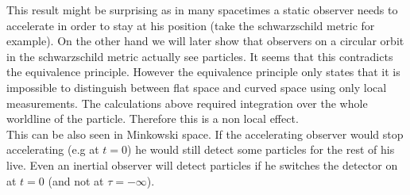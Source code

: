 This result might be surprising as in many spacetimes a static observer needs to accelerate in order to stay at his position (take the schwarzschild metric for example). On the other hand we will later show that observers on a circular orbit in the schwarzschild metric actually see particles. It seems that this contradicts the equivalence principle. However the equivalence principle only states that it is impossible to distinguish between flat space and curved space using only local measurements. The calculations above required integration over the whole worldline of the particle. Therefore this is a non local effect.\\
This can be also seen in Minkowski space. If the accelerating observer would stop accelerating (e.g at \(t = 0\)) he would still detect some particles for the rest of his live. Even an inertial observer will detect particles if he switches the detector on at \(t = 0\) (and not at \(\tau = -\infty\)).